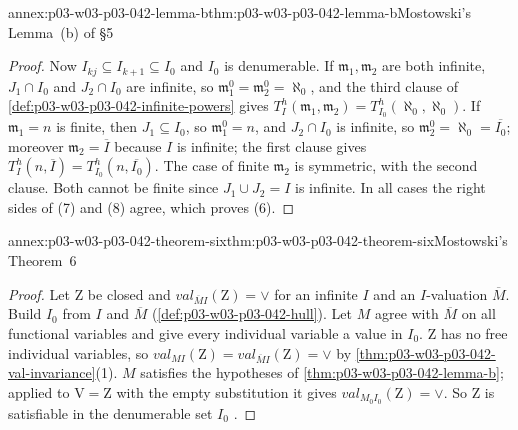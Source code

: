 \begin{annexitem}{annex:p03-w03-p03-042-lemma-b}{thm:p03-w03-p03-042-lemma-b}{Mostowski's Lemma~(b) of \S5}
\begin{proof}
Now \(I_{kj}\subseteq I_{k+1}\subseteq I_0\) and \(I_0\) is denumerable.
If \(\mathfrak m_1,\mathfrak m_2\) are both infinite, \(J_1\cap I_0\) and
\(J_2\cap I_0\) are infinite, so \(\mathfrak m^0_1=\mathfrak m^0_2=
\aleph_0\), and the third clause of
\cref{def:p03-w03-p03-042-infinite-powers} gives \(T^h_I(\mathfrak m_1,
\mathfrak m_2)=T^h_{I_0}(\aleph_0,\aleph_0)\).  If \(\mathfrak m_1=n\) is
finite, then \(J_1\subseteq I_0\), so \(\mathfrak m^0_1=n\), and
\(J_2\cap I_0\) is infinite, so \(\mathfrak m^0_2=\aleph_0=\overline{I_0}\);
moreover \(\mathfrak m_2=\overline I\) because \(I\) is infinite; the
first clause gives \(T^h_I(n,\overline I)=T^h_{I_0}(n,\overline{I_0})\).
The case of finite \(\mathfrak m_2\) is symmetric, with the second clause.
Both cannot be finite since \(J_1\cup J_2=I\) is infinite.  In all cases
the right sides of (7) and (8) agree, which proves (6).
\end{proof}
\end{annexitem}

\begin{annexitem}{annex:p03-w03-p03-042-theorem-six}{thm:p03-w03-p03-042-theorem-six}{Mostowski's Theorem~6}
\begin{proof}
Let \(\mathrm Z\) be closed and \(\mathit{val}_{\overline MI}(\mathrm
Z)=\vee\) for an infinite \(I\) and an \(I\)-valuation \(\overline M\).
Build \(I_0\) from \(I\) and \(\overline M\)
(\cref{def:p03-w03-p03-042-hull}).  Let \(M\) agree with \(\overline M\)
on all functional variables and give every individual variable a value in
\(I_0\).  \(\mathrm Z\) has no free individual variables, so
\(\mathit{val}_{MI}(\mathrm Z)=\mathit{val}_{\overline MI}(\mathrm Z)=\vee\)
by \cref{thm:p03-w03-p03-042-val-invariance}(1).  \(M\) satisfies the
hypotheses of \cref{thm:p03-w03-p03-042-lemma-b}; applied to
\(\mathrm V=\mathrm Z\) with the empty substitution it gives
\(\mathit{val}_{M_0I_0}(\mathrm Z)=\vee\).  So \(\mathrm Z\) is
satisfiable in the denumerable set \(I_0\) \cite[p.~23]{Mostowski1957}.
\end{proof}
\end{annexitem}


